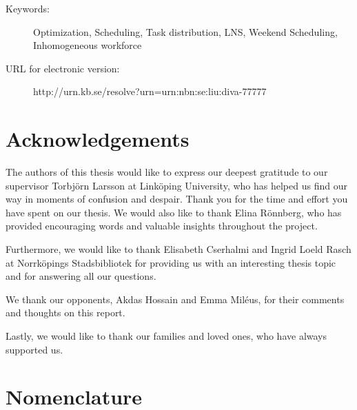 \documentclass[a4paper, 10pt, twoside, openright]{book}
\newcommand{\putkeywords}[0]{%
Optimization, Scheduling, Task distribution, LNS, Weekend Scheduling, Inhomogeneous workforce}
\begin{document}
\begin{description}
\item[Keywords:]{%
\putkeywords
}
\item[URL for electronic version: ]{\hfill%
\begin{center}
http://urn.kb.se/resolve?urn=urn:nbn:se:liu:diva-77777
\end{center}
}
\end{description}



\chapter*{Acknowledgements}

The authors of this thesis would like to express our deepest gratitude to our supervisor Torbjörn Larsson at Linköping University, who has helped us find our way in moments of confusion and despair. Thank you for the time and effort you have spent on our thesis. We would also like to thank Elina Rönnberg, who has provided encouraging words and valuable insights throughout the project.

Furthermore, we would like to thank Elisabeth Cserhalmi and Ingrid Loeld  Rasch at Norrköpings Stadsbibliotek for providing us with an interesting thesis topic and for answering all our questions.

We thank our opponents, Akdas Hossain and Emma Miléus, for their comments and thoughts on this report.

Lastly, we would like to thank our families and loved ones, who have always supported us. 



\chapter*{Nomenclature}
\end{document}
